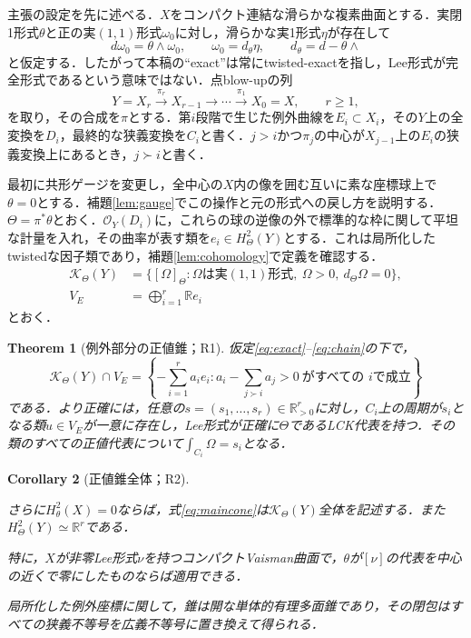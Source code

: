 \documentclass[12pt]{amsart}
\newtheorem{thm}{Theorem}[section]
\newtheorem{cor}[thm]{Corollary}
\theoremstyle{definition}
\theoremstyle{remark}
\numberwithin{equation}{section}
\newcommand{\cK}{\mathcal{K}}
\newcommand{\cO}{\mathcal{O}}
\newcommand{\R}{\mathbb{R}}
\begin{document}
主張の設定を先に述べる．$X$をコンパクト連結な滑らかな複素曲面とする．実閉1形式$\theta$と正の実$(1,1)$形式$\omega_0$に対し，滑らかな実1形式$\eta$が存在して
\begin{equation}\label{eq:exact}
 d\omega_0=\theta\wedge\omega_0,\qquad
 \omega_0=d_\theta\eta,\qquad d_\theta=d-\theta\wedge
\end{equation}
と仮定する．したがって本稿の``exact''は常にtwisted-exactを指し，Lee形式が完全形式であるという意味ではない．点blow-upの列
\begin{equation}\label{eq:chain}
 Y=X_r\xrightarrow{\pi_r}X_{r-1}\longrightarrow\cdots
 \xrightarrow{\pi_1}X_0=X,\qquad r\geq1,
\end{equation}
を取り，その合成を$\pi$とする．第$i$段階で生じた例外曲線を$E_i\subset X_i$，その$Y$上の全変換を$D_i$，最終的な狭義変換を$C_i$と書く．$j>i$かつ$\pi_j$の中心が$X_{j-1}$上の$E_i$の狭義変換上にあるとき，$j\succ i$と書く．

最初に共形ゲージを変更し，全中心の$X$内の像を囲む互いに素な座標球上で$\theta=0$とする．補題\ref{lem:gauge}でこの操作と元の形式への戻し方を説明する．$\Theta=\pi^*\theta$とおく．$\cO_Y(D_i)$に，これらの球の逆像の外で標準的な枠に関して平坦な計量を入れ，その曲率が表す類を$e_i\in H^2_\Theta(Y)$とする．これは局所化したtwistedな因子類であり，補題\ref{lem:cohomology}で定義を確認する．
\begin{equation}\label{eq:cone}
 \begin{split}
 \cK_\Theta(Y)&=\{[\Omega]_\Theta:\Omega\text{は実}(1,1)\text{形式},
 \ \Omega>0,\ d_\Theta\Omega=0\},\\
 V_E&=\bigoplus_{i=1}^r\R e_i
 \end{split}
\end{equation}
とおく．

\begin{thm}[例外部分の正値錐；R1]\label{thm:main}
仮定\eqref{eq:exact}--\eqref{eq:chain}の下で，
\begin{equation}\label{eq:maincone}
 \cK_\Theta(Y)\cap V_E
 =\left\{-\sum_{i=1}^r a_i e_i:
 a_i-\sum_{j\succ i}a_j>0\ \text{がすべての }i\text{で成立}\right\}
\end{equation}
である．より正確には，任意の$s=(s_1,\ldots,s_r)\in\R_{>0}^r$に対し，$C_i$上の周期が$s_i$となる類$u\in V_E$が一意に存在し，Lee形式が正確に$\Theta$であるLCK代表を持つ．その類のすべての正値代表について$\int_{C_i}\Omega=s_i$となる．
\end{thm}

\begin{cor}[正値錐全体；R2]\label{cor:full}\leavevmode\par
さらに$H^2_\theta(X)=0$ならば，式\eqref{eq:maincone}は$\cK_\Theta(Y)$全体を記述する．また$H^2_\Theta(Y)\simeq\R^r$である．

特に，$X$が非零Lee形式$\nu$を持つコンパクトVaisman曲面で，$\theta$が$[\nu]$の代表を中心の近くで零にしたものならば適用できる．

局所化した例外座標に関して，錐は開な単体的有理多面錐であり，その閉包はすべての狭義不等号を広義不等号に置き換えて得られる．
\end{cor}
\end{document}
